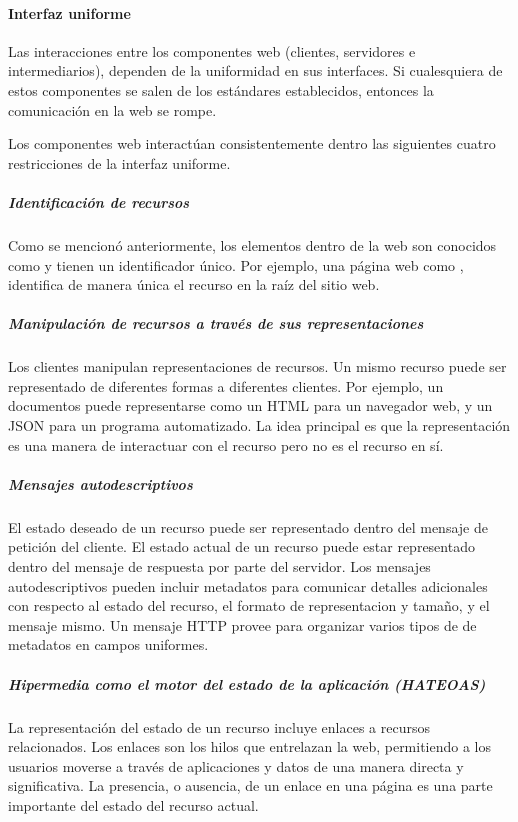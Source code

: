 \paragraph{Interfaz uniforme}
\label{\detokenize{chapter_one/rest:interfaz-uniforme}}
Las interacciones entre los componentes web (clientes, servidores e intermediarios),
dependen de la uniformidad en sus interfaces. Si cualesquiera de estos componentes se
salen de los estándares establecidos, entonces la comunicación en la web
se rompe.

Los componentes web interactúan consistentemente dentro las siguientes
cuatro restricciones de la interfaz uniforme.


\subparagraph{Identificación de recursos}
\label{\detokenize{chapter_one/rest:identificacion-de-recursos}}
Como se mencionó anteriormente, los elementos dentro de la web son
conocidos como  y tienen un identificador único. Por ejemplo, una
página web como , identifica de manera única el
recurso en la raíz del sitio web.


\subparagraph{Manipulación de recursos a través de sus representaciones}
\label{\detokenize{chapter_one/rest:manipulacion-de-recursos-a-traves-de-sus-representaciones}}
Los clientes manipulan representaciones de recursos. Un mismo
recurso puede ser representado de diferentes formas a diferentes
clientes. Por ejemplo, un documentos puede representarse como un HTML
para un navegador web, y un JSON para un programa automatizado. La idea
principal es que la representación es una manera de interactuar con el recurso
pero no es el recurso en sí.


\subparagraph{Mensajes autodescriptivos}
\label{\detokenize{chapter_one/rest:mensajes-autodescriptivos}}
El estado deseado de un recurso puede ser representado dentro del mensaje
de petición del cliente. El estado actual de un recurso puede estar representado
dentro del mensaje de respuesta por parte del servidor.
Los mensajes autodescriptivos pueden incluir metadatos para comunicar
detalles adicionales con respecto al estado del recurso, el formato
de representacion y tamaño, y el mensaje mismo.
Un mensaje HTTP provee  para organizar varios tipos de
de metadatos en campos uniformes.


\subparagraph{Hipermedia como el motor del estado de la aplicación (HATEOAS)}
\label{\detokenize{chapter_one/rest:hipermedia-como-el-motor-del-estado-de-la-aplicacion-hateoas}}
La representación del estado de un recurso incluye enlaces a recursos
relacionados. Los enlaces son los hilos que entrelazan la web, permitiendo
a los usuarios moverse a través de aplicaciones y datos de una manera directa
y significativa. La presencia, o ausencia, de un enlace en una página es una
parte importante del estado del recurso actual.


